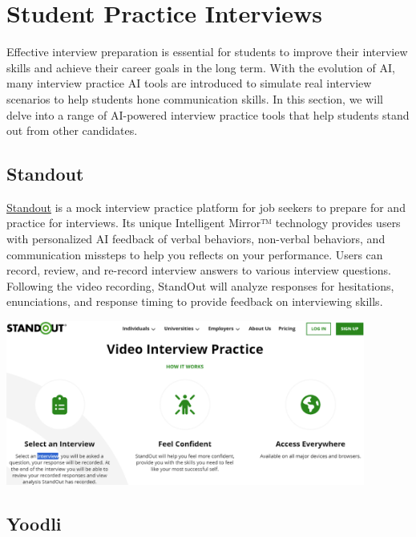 \documentclass[
]{book}
\begin{document}
\hypertarget{student-practice-interviews}{%
\chapter{Student Practice Interviews}\label{student-practice-interviews}}

Effective interview preparation is essential for students to improve their interview skills and achieve their career goals in the long term. With the evolution of AI, many interview practice AI tools are introduced to simulate real interview scenarios to help students hone communication skills. In this section, we will delve into a range of AI-powered interview practice tools that help students stand out from other candidates.

\hypertarget{standout}{%
\section{Standout}\label{standout}}

\href{https://standout.com/}{Standout} is a mock interview practice platform for job seekers to prepare for and practice for interviews. Its unique Intelligent Mirror™ technology provides users with personalized AI feedback of verbal behaviors, non-verbal behaviors, and communication missteps to help you reflects on your performance. Users can record, review, and re-record interview answers to various interview questions. Following the video recording, StandOut will analyze responses for hesitations, enunciations, and response timing to provide feedback on interviewing skills.

\includegraphics[width=4.64583in,height=\textheight]{standout pic.png}

\hypertarget{yoodli}{%
\section{Yoodli}\label{yoodli}}
\end{document}

